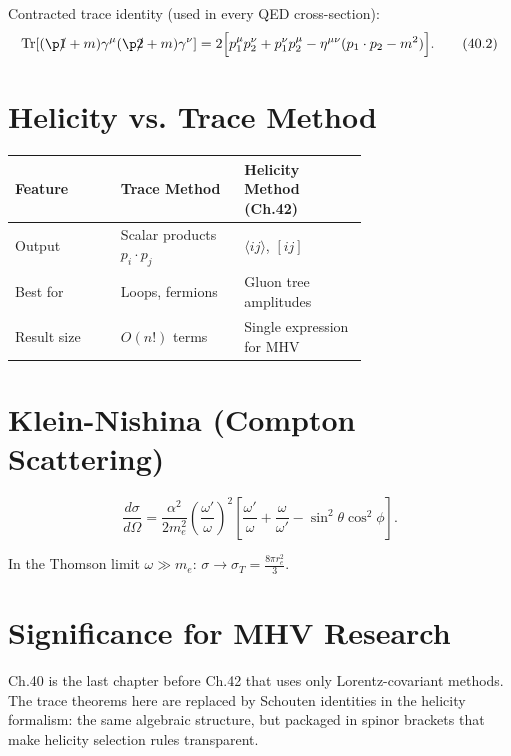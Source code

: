 \documentclass[12pt]{article}
\DeclareMathOperator\Tr{Tr}
\begin{document}
Contracted trace identity (used in every QED cross-section):
\begin{equation}
\Tr[(\p1\!\!\!/+m)\gamma^\mu(\p2\!\!\!/+m)\gamma^\nu]
= 2\Bigl[p_1^\mu p_2^\nu + p_1^\nu p_2^\mu
         -\eta^{\mu\nu}(p_1\cdot p_2-m^2)\Bigr] .
\tag{40.2}
\end{equation}

\section{Helicity vs. Trace Method}\label{sec:vs_helicity}
\begin{center}
\begin{tabular}{|l|p{0.35\linewidth}|p{0.35\linewidth}|}
\hline
Feature & Trace Method & Helicity Method (Ch.42) \\
\hline
Output & Scalar products $p_i\cdot p_j$ & $\langle ij\rangle$, $[ij]$ \\
Best for & Loops, fermions & Gluon tree amplitudes \\
Result size & $O(n!)$ terms & Single expression for MHV \\
\hline
\end{tabular}
\end{center}

\section{Klein-Nishina (Compton Scattering)}\label{sec:compton}
\begin{mdframed}[backgroundcolor=red!5]
\begin{equation}
\frac{d\sigma}{d\Omega}
= \frac{\alpha^2}{2m_e^2}
\left(\frac{\omega'}{\omega}\right)^2
\left[\frac{\omega'}{\omega}+\frac{\omega}{\omega'}
-\sin^2\theta\cos^2\phi\right] .
\tag{40.$\star\star$}
\end{equation}
\end{mdframed}
In the Thomson limit $\omega\gg m_e$: $\sigma\to\sigma_T=\frac{8\pi r_e^2}{3}$.

\section{Significance for MHV Research}
Ch.40 is the last chapter before Ch.42 that uses only Lorentz-covariant
methods.  The trace theorems here are replaced by Schouten identities in the
helicity formalism: the same algebraic structure, but packaged in spinor
brackets that make helicity selection rules transparent.

\vfill
\end{document}
